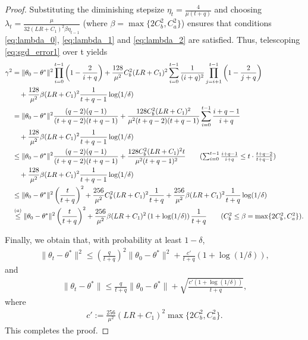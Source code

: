 \documentclass[11 pt]{article}
\begin{document}
\begin{proof}
Substituting the diminishing stepsize $\eta_t=\frac{4}{\mu(t+q)}$ and choosing $\displaystyle \lambda_t=\frac{\mu}{32(LR+C_1)^2\beta\eta_{t-1}}$ (where $\beta=\max\{2C_b^2,C_a^2\}$) ensures that conditions \eqref{eq:lambda_0},  \eqref{eq:lambda_1} and \eqref{eq:lambda_2} are satisfied. Thus, telescoping \eqref{eq:sgd_error1} over t yields 
\begin{align*}
    \gamma^2&=\|\theta_0-\theta^*\|^2\prod_{i=0}^{t-1}\left(1-\frac{2}{i+q} \right) +\frac{128}{\mu^2}C_b^2(LR+C_1)^2\sum_{i=0}^{t-1}\frac{1}{(i+q)^2} \prod_{j=i+1}^{t-1}\left(1-\frac{2}{j+q}\right) \\
    & \quad +\frac{128}{\mu^2}\beta(LR+C_1)^2 \frac{1}{t+q-1} \log(1/\delta)\\
    &= \|\theta_0-\theta^*\|^2\frac{(q-2)(q-1)}{(t+q-2)(t+q-1)} +\frac{128C_b^2(LR+C_1)^2}{\mu^2(t+q-2)(t+q-1)}\sum_{i=0}^{t-1}\frac{i+q-1}{i+q}  \\
    & \quad +\frac{128}{\mu^2}\beta(LR+C_1)^2 \frac{1}{t+q-1} \log(1/\delta) \\
    & \leq  \|\theta_0-\theta^*\|^2\frac{(q-2)(q-1)}{(t+q-2)(t+q-1)} +\frac{128C_b^2(LR+C_1)^2t}{\mu^2(t+q-1)^2} \tag{$\sum_{i=0}^{t-1}\frac{i+q-1}{i+q} \leq t\cdot \frac{t+q-2}{t+q-1}$}  \\  
    & \quad +\frac{128}{\mu^2}\beta(LR+C_1)^2 \frac{1}{t+q-1} \log(1/\delta) \\
    & \leq \|\theta_0-\theta^*\|^2\left(\frac{t}{t+q} \right)^2+\frac{256}{\mu^2}C_b^2(LR+C_1)^2\frac{1}{t+q} +\frac{256}{\mu^2}\beta(LR+C_1)^2 \frac{1}{t+q} \log(1/\delta) \\
    & \overset{(a)}{\leq} \|\theta_0-\theta^*\|^2\left(\frac{t}{t+q} \right)^2+\frac{256}{\mu^2}\beta(LR+C_1)^2\left(1+\log(1/\delta)\right)\frac{1}{t+q}\tag{$C_b^2\leq\beta=\max\{2C_b^2,C_a^2 \}$}. 
    \end{align*}

Finally, we obtain that, with probability at least $1-\delta$,
\begin{align*}
    \|\theta_t-\theta^*\|^2\leq \left(\frac{q}{t+q}\right)^2\|\theta_0-\theta^*\|^2+\frac{c'}{t+q}(1+\log(1/\delta)),
\end{align*}
and 
\begin{align*}
    \|\theta_t-\theta^*\|\leq \frac{q}{t+q}\|\theta_0-\theta^*\|+\sqrt{\frac{c'(1+\log(1/\delta))}{t+q}},
\end{align*}
where 
\begin{align}\label{eq:def_c'}
    c':=\frac{256}{\mu^2}(LR+C_1)^2\max\{2C_b^2,C_a^2\}.
\end{align}
This completes the proof.
\end{proof}
\end{document}
